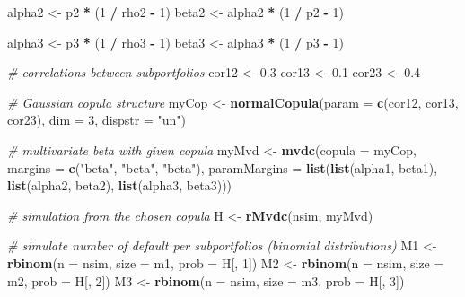 \documentclass[
]{article}
\newenvironment{Shaded}{\begin{snugshade}}{\end{snugshade}}
\newcommand{\CommentTok}[1]{\textcolor[rgb]{0.56,0.35,0.01}{\textit{#1}}}
\newcommand{\DataTypeTok}[1]{\textcolor[rgb]{0.13,0.29,0.53}{#1}}
\newcommand{\DecValTok}[1]{\textcolor[rgb]{0.00,0.00,0.81}{#1}}
\newcommand{\FloatTok}[1]{\textcolor[rgb]{0.00,0.00,0.81}{#1}}
\newcommand{\KeywordTok}[1]{\textcolor[rgb]{0.13,0.29,0.53}{\textbf{#1}}}
\newcommand{\NormalTok}[1]{#1}
\newcommand{\OperatorTok}[1]{\textcolor[rgb]{0.81,0.36,0.00}{\textbf{#1}}}
\newcommand{\StringTok}[1]{\textcolor[rgb]{0.31,0.60,0.02}{#1}}
\begin{document}
\begin{Shaded}
\begin{Highlighting}[]
\NormalTok{  alpha2 \textless{}{-}}\StringTok{ }\NormalTok{p2 }\OperatorTok{*}\StringTok{ }\NormalTok{(}\DecValTok{1} \OperatorTok{/}\StringTok{ }\NormalTok{rho2 }\OperatorTok{{-}}\StringTok{ }\DecValTok{1}\NormalTok{)}
\NormalTok{  beta2 \textless{}{-}}\StringTok{ }\NormalTok{alpha2 }\OperatorTok{*}\StringTok{ }\NormalTok{(}\DecValTok{1} \OperatorTok{/}\StringTok{ }\NormalTok{p2 }\OperatorTok{{-}}\StringTok{ }\DecValTok{1}\NormalTok{)}
  
\NormalTok{  alpha3 \textless{}{-}}\StringTok{ }\NormalTok{p3 }\OperatorTok{*}\StringTok{ }\NormalTok{(}\DecValTok{1} \OperatorTok{/}\StringTok{ }\NormalTok{rho3 }\OperatorTok{{-}}\StringTok{ }\DecValTok{1}\NormalTok{)}
\NormalTok{  beta3 \textless{}{-}}\StringTok{ }\NormalTok{alpha3 }\OperatorTok{*}\StringTok{ }\NormalTok{(}\DecValTok{1} \OperatorTok{/}\StringTok{ }\NormalTok{p3 }\OperatorTok{{-}}\StringTok{ }\DecValTok{1}\NormalTok{)}
  
\CommentTok{\# correlations between subportfolios}
\NormalTok{  cor12 \textless{}{-}}\StringTok{ }\FloatTok{0.3}
\NormalTok{  cor13 \textless{}{-}}\StringTok{ }\FloatTok{0.1}
\NormalTok{  cor23 \textless{}{-}}\StringTok{ }\FloatTok{0.4}
  
\CommentTok{\# Gaussian copula structure}
\NormalTok{  myCop \textless{}{-}}\StringTok{ }\KeywordTok{normalCopula}\NormalTok{(}\DataTypeTok{param =} \KeywordTok{c}\NormalTok{(cor12, cor13, cor23), }\DataTypeTok{dim =} \DecValTok{3}\NormalTok{, }\DataTypeTok{dispstr =} \StringTok{"un"}\NormalTok{)}
  
\CommentTok{\# multivariate beta with given copula}
\NormalTok{  myMvd \textless{}{-}}\StringTok{ }\KeywordTok{mvdc}\NormalTok{(}\DataTypeTok{copula =}\NormalTok{ myCop,}
                \DataTypeTok{margins =} \KeywordTok{c}\NormalTok{(}\StringTok{"beta"}\NormalTok{, }\StringTok{"beta"}\NormalTok{, }\StringTok{"beta"}\NormalTok{),}
                \DataTypeTok{paramMargins =} \KeywordTok{list}\NormalTok{(}\KeywordTok{list}\NormalTok{(alpha1, beta1),}
                                    \KeywordTok{list}\NormalTok{(alpha2, beta2),}
                                    \KeywordTok{list}\NormalTok{(alpha3, beta3)))}

\CommentTok{\# simulation from the chosen copula}
\NormalTok{  H \textless{}{-}}\StringTok{ }\KeywordTok{rMvdc}\NormalTok{(nsim, myMvd)}
  
\CommentTok{\# simulate number of default per subportfolios (binomial distributions)}
\NormalTok{  M1 \textless{}{-}}\StringTok{ }\KeywordTok{rbinom}\NormalTok{(}\DataTypeTok{n =}\NormalTok{ nsim, }\DataTypeTok{size =}\NormalTok{ m1, }\DataTypeTok{prob =}\NormalTok{ H[, }\DecValTok{1}\NormalTok{])}
\NormalTok{  M2 \textless{}{-}}\StringTok{ }\KeywordTok{rbinom}\NormalTok{(}\DataTypeTok{n =}\NormalTok{ nsim, }\DataTypeTok{size =}\NormalTok{ m2, }\DataTypeTok{prob =}\NormalTok{ H[, }\DecValTok{2}\NormalTok{])}
\NormalTok{  M3 \textless{}{-}}\StringTok{ }\KeywordTok{rbinom}\NormalTok{(}\DataTypeTok{n =}\NormalTok{ nsim, }\DataTypeTok{size =}\NormalTok{ m3, }\DataTypeTok{prob =}\NormalTok{ H[, }\DecValTok{3}\NormalTok{])}
  

\end{Highlighting}
\end{Shaded}
\end{document}
